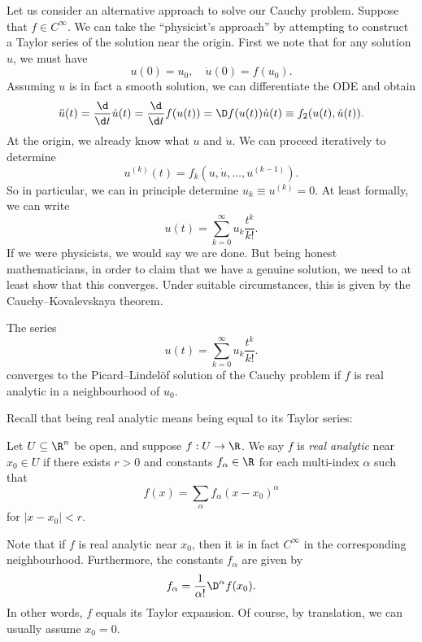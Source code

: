 \documentclass[a4paper]{article}
\begin{document}
Let us consider an alternative approach to solve our Cauchy problem. Suppose that $f \in C^\infty$. We can take the ``physicist's approach'' by attempting to construct a Taylor series of the solution near the origin. First we note that for any solution $u$, we must have
\[
   u(0) = u_0,\quad \dot{u}(0) = f(u_0).
\]
Assuming $u$ is in fact a smooth solution, we can differentiate the ODE and obtain
\[
  \ddot{u}(t) = \frac{\d}{\d t} \dot{u}(t) = \frac{\d}{\d t} f(u(t)) = \D f(u(t)) \dot{u}(t) \equiv f_2(u(t), \dot{u}(t)).
\]
At the origin, we already know what $u$ and $\dot{u}$. We can proceed iteratively to determine
\[
  u^{(k)}(t) = f_k (u, \dot{u}, \ldots, u^{(k - 1)}).
\]
So in particular, we can in principle determine $u_k \equiv u^{(k)} = 0$. At least formally, we can write
\[
  u(t) = \sum_{k = 0}^\infty u_k \frac{t^k}{k!}.
\]
If we were physicists, we would say we are done. But being honest mathematicians, in order to claim that we have a genuine solution, we need to at least show that this converges. Under suitable circumstances, this is given by the Cauchy--Kovalevskaya theorem.

\begin{thm}
  The series
  \[
    u(t) = \sum_{k = 0}^\infty u_k \frac{t^k}{k!}.
  \]
  converges to the Picard--Lindel\"of solution of the Cauchy problem if $f$ is real analytic in a neighbourhood of $u_0$.
\end{thm}

Recall that being real analytic means being equal to its Taylor series:
\begin{defi}
  Let $U \subseteq \R^n$ be open, and suppose $f: U \to \R$. We say $f$ is \emph{real analytic} near $x_0 \in U$ if there exists $r > 0$ and constants $f_\alpha \in \R$ for each multi-index $\alpha$ such that
  \[
    f(x) = \sum_\alpha f_\alpha (x - x_0)^\alpha
  \]
  for $|x - x_0| < r$.
\end{defi}

Note that if $f$ is real analytic near $x_0$, then it is in fact $C^\infty$ in the corresponding neighbourhood. Furthermore, the constants $f_\alpha$ are given by
\[
  f_\alpha = \frac{1}{\alpha!} \D^\alpha f(x_0).
\]
In other words, $f$ equals its Taylor expansion. Of course, by translation, we can usually assume $x_0 = 0$.
\end{document}
